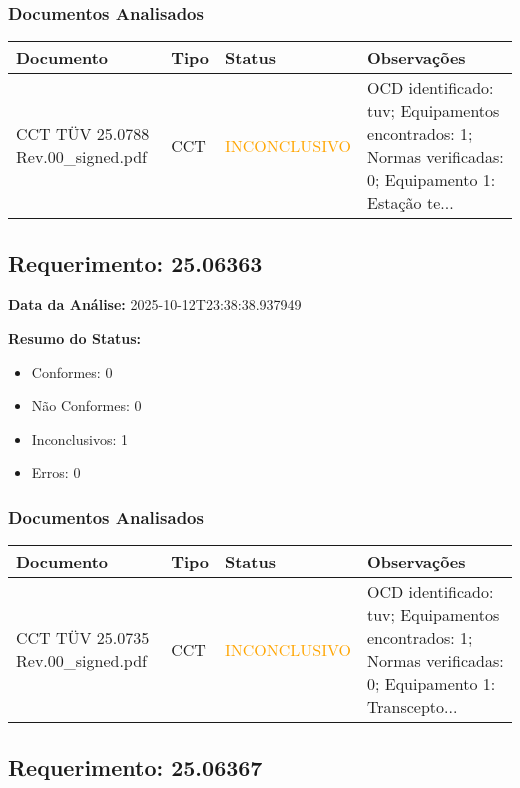 \documentclass[12pt,a4paper]{article}
\begin{document}
\subsubsection{Documentos Analisados}

\begin{longtable}{|p{4cm}|p{2cm}|p{2cm}|p{6cm}|}
\hline
\textbf{Documento} & \textbf{Tipo} & \textbf{Status} & \textbf{Observações} \\
\hline
\endhead
CCT TÜV 25.0788 Rev.00\_signed.pdf & CCT & \textcolor{orange}{INCONCLUSIVO} & OCD identificado: tuv; Equipamentos encontrados: 1; Normas verificadas: 0; Equipamento 1: Estação te... \\
\hline
\end{longtable}


\subsection{Requerimento: 25.06363}

\textbf{Data da Análise:} 2025-10-12T23:38:38.937949

\textbf{Resumo do Status:}
\begin{itemize}
    \item Conformes: 0
    \item Não Conformes: 0
    \item Inconclusivos: 1
    \item Erros: 0
\end{itemize}

\subsubsection{Documentos Analisados}

\begin{longtable}{|p{4cm}|p{2cm}|p{2cm}|p{6cm}|}
\hline
\textbf{Documento} & \textbf{Tipo} & \textbf{Status} & \textbf{Observações} \\
\hline
\endhead
CCT TÜV 25.0735 Rev.00\_signed.pdf & CCT & \textcolor{orange}{INCONCLUSIVO} & OCD identificado: tuv; Equipamentos encontrados: 1; Normas verificadas: 0; Equipamento 1: Transcepto... \\
\hline
\end{longtable}


\subsection{Requerimento: 25.06367}
\end{document}
